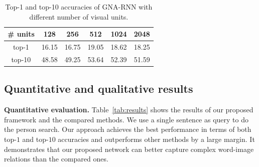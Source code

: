 \setlength{\tabcolsep}{7pt}
\begin{table}[t]
	\begin{center}
		
		\begin{tabular}{c|c|c|c|c|c}
			\hline
			
			\hline
			\# units & 128 & 256 & 512 & 1024 & 2048\\
			\hline
			
			\hline\noalign{\smallskip}\hline
			
			\hline
			top-1 		& 16.15 & 16.75 & 19.05 & 18.62 & 18.25 \\
			\hline
			top-10  	& 48.58 & 49.25 & 53.64 & 52.39 & 51.59 \\
			\hline
			
		\end{tabular}
	\end{center}
	\vspace{-5pt}
	\caption{Top-1 and top-10 accuracies of GNA-RNN with different number of visual units.}
	\label{tab:VN}
	\vspace{-10pt}
\end{table}




\subsection{Quantitative and qualitative results}
\label{exp:results}

{\bf Quantitative evaluation.} Table~\ref{tab:results} shows the results of our proposed framework and the compared methods. We use a single sentence as query to do the person search.
Our approach achieves the best performance in terms of both top-$1$ and top-$10$ accuracies and outperforms other methods by a large margin. It demonstrates that our proposed network can better capture complex word-image relations than the compared ones.

